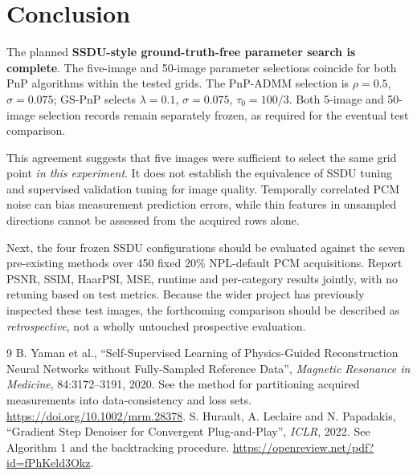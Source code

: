 \documentclass[a4paper,10pt]{article}
\begin{document}
\section{Conclusion}

The planned \textbf{SSDU-style ground-truth-free parameter search is complete}. The five-image and 50-image parameter selections coincide for both PnP algorithms within the tested grids. The PnP-ADMM selection is $\rho=0.5$, $\sigma=0.075$; GS-PnP selects $\lambda=0.1$, $\sigma=0.075$, $\tau_0=100/3$. Both 5-image and 50-image selection records remain separately frozen, as required for the eventual test comparison.

This agreement suggests that five images were sufficient to select the same grid point \emph{in this experiment}. It does not establish the equivalence of SSDU tuning and supervised validation tuning for image quality. Temporally correlated PCM noise can bias measurement prediction errors, while thin features in unsampled directions cannot be assessed from the acquired rows alone.

Next, the four frozen SSDU configurations should be evaluated against the seven pre-existing methods over 450 fixed 20\% NPL-default PCM acquisitions. Report PSNR, SSIM, HaarPSI, MSE, runtime and per-category results jointly, with no retuning based on test metrics. Because the wider project has previously inspected these test images, the forthcoming comparison should be described as \emph{retrospective}, not a wholly untouched prospective evaluation.

\renewcommand{\refname}{Primary references}
\begin{thebibliography}{9}
 B. Yaman et al., ``Self-Supervised Learning of Physics-Guided Reconstruction Neural Networks without Fully-Sampled Reference Data'', \emph{Magnetic Resonance in Medicine}, 84:3172--3191, 2020. See the method for partitioning acquired measurements into data-consistency and loss sets. \url{https://doi.org/10.1002/mrm.28378}.
 S. Hurault, A. Leclaire and N. Papadakis, ``Gradient Step Denoiser for Convergent Plug-and-Play'', \emph{ICLR}, 2022. See Algorithm 1 and the backtracking procedure. \url{https://openreview.net/pdf?id=fPhKeld3Okz}.
\end{thebibliography}
\end{document}
